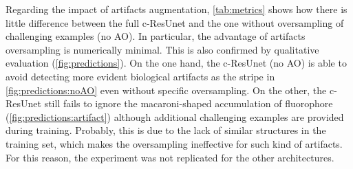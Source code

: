 Regarding the impact of artifacts augmentation, \cref{tab:metrics} shows how there is little difference between the full c-ResUnet and the one without oversampling of challenging examples (no AO).
In particular, the advantage of artifacts oversampling is numerically minimal.
This is also confirmed by qualitative evaluation (\cref{fig:predictions}).
On the one hand, the c-ResUnet (no AO) is able to avoid detecting more evident biological artifacts as the stripe  in \cref{fig:predictions:noAO} even without specific oversampling.
On the other, the c-ResUnet  still fails to ignore the macaroni-shaped accumulation of fluorophore (\cref{fig:predictions:artifact}) although additional challenging examples are provided during training.
Probably, this is due to the lack of similar structures in the training set, which makes the oversampling ineffective for such kind of artifacts.
For this reason, the experiment was not replicated for the other architectures. 

